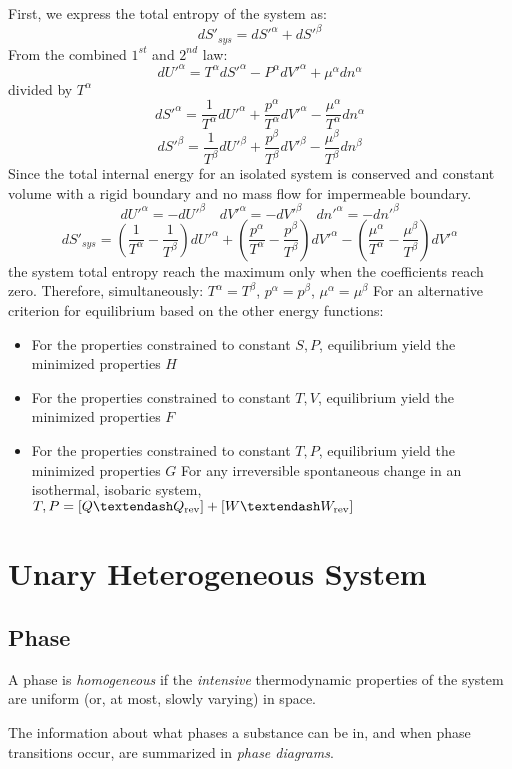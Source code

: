 \documentclass[UTF8]{book}
\begin{document}
 {First, we express the total entropy of the system as:}
$$dS'_{sys}=dS'^\alpha +dS'^\beta $$
 {From the combined $1^{st}$ and $2^{nd}$ law:}
$$dU'^\alpha =T^\alpha dS'^\alpha -P^\alpha dV'^\alpha +\mu ^\alpha dn^\alpha $$
 {divided by $T^\alpha $}
$$dS'^\alpha =\dfrac{1}{T^\alpha }dU'^\alpha +\dfrac{p^\alpha }{T^\alpha }dV'^\alpha -\dfrac{\mu ^\alpha }{T^\alpha }dn^\alpha $$
$$dS'^\beta  =\dfrac{1}{T^\beta }dU'^\beta +\dfrac{p^\beta }{T^\beta }dV'^\beta -\dfrac{\mu ^\beta }{T^\beta }dn^\beta $$
 {Since the total internal energy for an isolated system is conserved and constant volume with a rigid boundary and no mass flow for impermeable boundary.}
$$dU'^\alpha=-dU'^\beta \quad dV'^\alpha=-dV'^\beta \quad dn'^\alpha=-dn'^\beta $$
$$dS'_{sys}=\left(\dfrac{1}{T^\alpha }-\dfrac{1}{T^\beta }\right)dU'^\alpha+\left(\dfrac{p^\alpha }{T^\alpha }-\dfrac{p^\beta }{T^\beta }\right)dV'^\alpha-\left(\dfrac{\mu ^\alpha }{T^\alpha }-\dfrac{\mu ^\beta }{T^\beta }\right)dV'^\alpha $$
 {the system total entropy reach the maximum only when the coefficients reach zero. Therefore, simultaneously: $T^\alpha =T^\beta $, $p^\alpha =p^\beta $, $\mu ^\alpha =\mu ^\beta $}
 {For an alternative criterion for equilibrium based on the other energy functions: }
\begin{itemize}
\item  {For the properties constrained to constant $S,P$, equilibrium yield the minimized properties $H$}
\item  {For the properties constrained to constant $T,V$, equilibrium yield the minimized properties $F$}
\item  {For the properties constrained to constant $T,P$, equilibrium yield the minimized properties $G$}
For any irreversible spontaneous change in an
isothermal, isobaric system, $ T,P = [Q – Q_{\rm rev} ] + [W – W_{\rm rev} ]$
\end{itemize}

\section{Unary Heterogeneous System}
\subsection{Phase}
A phase is \emph{homogeneous} if the
\emph{intensive} thermodynamic properties
of the system are uniform (or, at
most, slowly varying) in space.

The information about what phases a substance can be
in, and when phase transitions occur, are summarized in
\emph{phase diagrams}.
\end{document}
